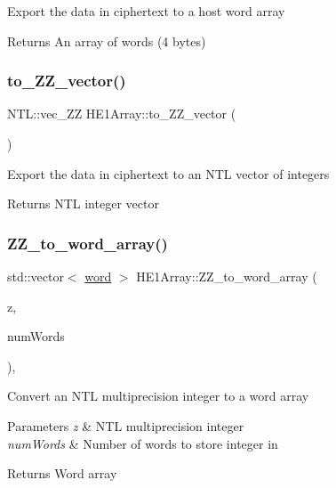 Export the data in {\ttfamily ciphertext} to a host word array \begin{DoxyReturn}{Returns}
An array of words (4 bytes) 
\end{DoxyReturn}
\mbox{\label{classHE1Array_a43de83bb8ed2cf9063e60acccd2031e8}} 
\subsubsection{\texorpdfstring{to\+\_\+\+Z\+Z\+\_\+vector()}{to\_ZZ\_vector()}}
{\footnotesize\ttfamily N\+T\+L\+::vec\+\_\+\+ZZ H\+E1\+Array\+::to\+\_\+\+Z\+Z\+\_\+vector (\begin{DoxyParamCaption}{ }\end{DoxyParamCaption})}

Export the data in {\ttfamily ciphertext} to an N\+TL vector of integers \begin{DoxyReturn}{Returns}
N\+TL integer vector 
\end{DoxyReturn}
\mbox{\label{classHE1Array_a60718a561d39e7036c32abcf92c5c9c1}} 
\subsubsection{\texorpdfstring{Z\+Z\+\_\+to\+\_\+word\+\_\+array()}{ZZ\_to\_word\_array()}}
{\footnotesize\ttfamily std\+::vector$<$ \hyperlink{HE1Array_8h_a19036394f9c80a08fc846c96f668711c}{word} $>$ H\+E1\+Array\+::\+Z\+Z\+\_\+to\+\_\+word\+\_\+array (\begin{DoxyParamCaption}\item[{N\+T\+L\+::\+ZZ \&}]{z,  }\item[{int}]{num\+Words }\end{DoxyParamCaption})\hspace{0.3cm}{\ttfamily [static]}, {\ttfamily [private]}}

Convert an N\+TL multiprecision integer to a word array 
\begin{DoxyParams}{Parameters}
{\em z} & N\+TL multiprecision integer \\
\hline
{\em num\+Words} & Number of words to store integer in \\
\hline
\end{DoxyParams}
\begin{DoxyReturn}{Returns}
Word array 
\end{DoxyReturn}


